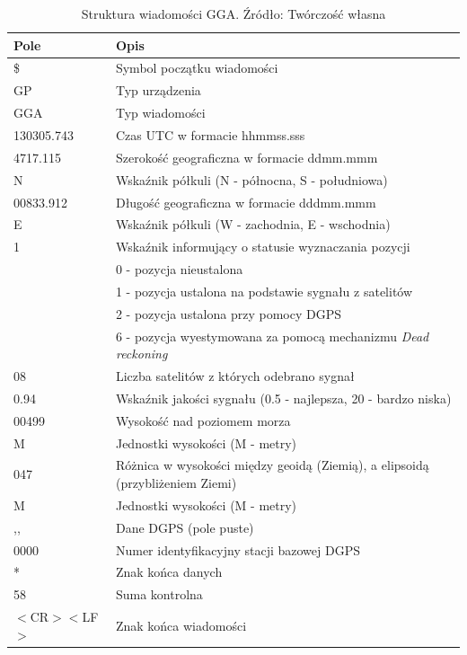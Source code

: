\begin{table}[H]
\centering
\caption{Struktura wiadomości GGA. Źródło: Twórczość własna}
\label{table:table_nmea_gga_message}
\begin{tabular}{| l | l |}
\hline
\textbf{Pole} & \textbf{Opis} \\ \hline
\$ & Symbol początku wiadomości  \\ \hline
GP & Typ urządzenia  \\ \hline
GGA & Typ wiadomości  \\ \hline
130305.743 & Czas UTC w formacie hhmmss.sss \\ \hline
4717.115 & Szerokość geograficzna w formacie ddmm.mmm \\ \hline
N & Wskaźnik półkuli (N - północna, S - południowa) \\ \hline
00833.912 & Długość geograficzna w formacie dddmm.mmm  \\ \hline
E & Wskaźnik półkuli (W - zachodnia, E - wschodnia) \\ \hline
1 & Wskaźnik informujący o statusie wyznaczania pozycji \\ 
 & 0 - pozycja nieustalona \\ 
 & 1 - pozycja ustalona na podstawie sygnału z satelitów \\ 
 & 2 - pozycja ustalona przy pomocy DGPS \\ 
 & 6 - pozycja wyestymowana za pomocą mechanizmu \textit{Dead reckoning} \\ \hline
08 & Liczba satelitów z których odebrano sygnał \\ \hline
0.94 & Wskaźnik jakości sygnału (0.5 - najlepsza, 20 - bardzo niska) \\ \hline
00499 & Wysokość nad poziomem morza \\ \hline
M & Jednostki wysokości (M - metry) \\ \hline
047 & Różnica w wysokości między geoidą (Ziemią), a elipsoidą (przybliżeniem Ziemi) \\ \hline
M & Jednostki wysokości (M - metry) \\ \hline
,, & Dane DGPS (pole puste) \\ \hline
0000 & Numer identyfikacyjny stacji bazowej DGPS \\ \hline
* & Znak końca danych \\ \hline
58 & Suma kontrolna \\ \hline
$<$CR$><$LF$>$ & Znak końca wiadomości \\ \hline
\end{tabular}
\end{table}

